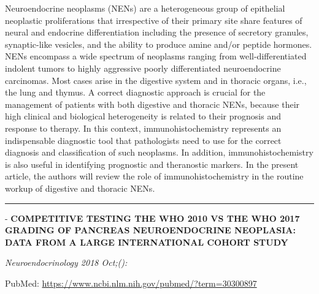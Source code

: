 \documentclass[]{article}
\begin{document}
Neuroendocrine neoplasms (NENs) are a heterogeneous group of epithelial
neoplastic proliferations that irrespective of their primary site share
features of neural and endocrine differentiation including the presence
of secretory granules, synaptic-like vesicles, and the ability to
produce amine and/or peptide hormones. NENs encompass a wide spectrum of
neoplasms ranging from well-differentiated indolent tumors to highly
aggressive poorly differentiated neuroendocrine carcinomas. Most cases
arise in the digestive system and in thoracic organs, i.e., the lung and
thymus. A correct diagnostic approach is crucial for the management of
patients with both digestive and thoracic NENs, because their high
clinical and biological heterogeneity is related to their prognosis and
response to therapy. In this context, immunohistochemistry represents an
indispensable diagnostic tool that pathologists need to use for the
correct diagnosis and classification of such neoplasms. In addition,
immunohistochemistry is also useful in identifying prognostic and
theranostic markers. In the present article, the authors will review the
role of immunohistochemistry in the routine workup of digestive and
thoracic NENs.

{}

{}

\begin{center}\rule{0.5\linewidth}{\linethickness}\end{center}

 - \textbf{COMPETITIVE TESTING THE WHO 2010 VS THE WHO 2017 GRADING OF
PANCREAS NEUROENDOCRINE NEOPLASIA: DATA FROM A LARGE INTERNATIONAL
COHORT STUDY}

\emph{Neuroendocrinology 2018 Oct;():}

PubMed: \url{https://www.ncbi.nlm.nih.gov/pubmed/?term=30300897}
\end{document}
